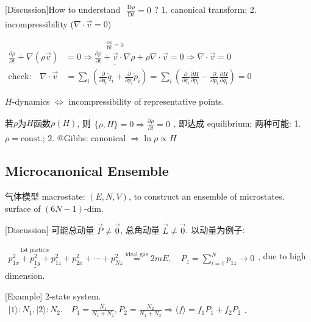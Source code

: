 \documentclass[../../main.tex]{subfiles}
\begin{document}
[Discussion]How to understand $\begin{aligned}
    \frac{\mathrm{D}\rho}{\mathrm{D}t} = 0
\end{aligned}$? 1. canonical transform; 2. incompressibility ($\nabla\cdot\vec{v}=0$)

$\begin{aligned}
    \frac{\partial\rho}{\partial t} + \nabla(\rho\vec{v}) &= 0
    \Rightarrow \stackrel{\frac{\mathrm{D}\rho}{\mathrm{D}t}=0}{\underline{\frac{\partial\rho}{\partial t} + \vec{v}\cdot\nabla\rho}} + \rho\nabla\cdot\vec{v} = 0 \Rightarrow \nabla\cdot\vec{v} = 0\\
    \text{check:}\quad\nabla\cdot\vec{v} &= \sum_{i}\left(\frac{\partial}{\partial q_{i}}\dot{q}_{i} + \frac{\partial}{\partial p_{i}}\dot{p}_{i}\right) = \sum_{i}\left(\frac{\partial}{\partial q_{i}}\frac{\partial H}{\partial p_{i}} - \frac{\partial}{\partial p_{i}}\frac{\partial H}{\partial q_{i}}\right) = 0
\end{aligned}$

$H$-dynamics $\Leftrightarrow$ incompressibility of representative points.

若$\rho$为$H$函数$\rho(H)$, 则$\begin{aligned}
    \{\rho, H\} = 0\Rightarrow \frac{\partial \rho}{\partial t} = 0
\end{aligned}$, 即达成 equilibrium; 两种可能: 1. $\rho = \text{const.}$; 2. @Gibbs: canonical $\Rightarrow\ln{\rho}\propto H$

\subsection{Microcanonical Ensemble}
气体模型 macrostate: $(E,N,V)$, to construct an ensemble of microstates. surface of $(6N-1)$-dim. 

[Discussion] 可能总动量 $\vec{P}\neq \vec{0}$, 总角动量 $\vec{L}\neq\vec{0}$. 以动量为例子: 

$\begin{aligned}
    \stackrel{\text{1st particle}}{\underline{p_{1x}^{2}+p_{1y}^{2} + p_{1z}^{2}}} + p_{2x}^{2} + \cdots + p_{Nz}^{2} \stackrel{\text{ideal gas}}{=} 2m E,\quad 
    P_{z} = \sum_{i=1}^{N}p_{1z} \rightarrow 0
\end{aligned}$, due to high dimension.

[Example] 2-state system. 
$\begin{aligned}
    |1\rangle: N_{1}, |2\rangle: N_{2}.\quad P_{1} = \frac{N_{1}}{N_{1}+N_{2}},P_{2} = \frac{N_{2}}{N_{1}+N_{2}}
    \Rightarrow \langle f\rangle = f_{1}P_{1} + f_{2}P_{2}
\end{aligned}$. 
\end{document}
